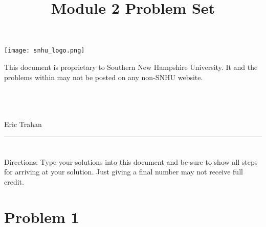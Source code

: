\documentclass{amsart}
\theoremstyle{definition}
\theoremstyle{Exercise}
\theoremstyle{remark}
\theoremstyle{rule}
\numberwithin{equation}{section}
\begin{document}
\title{\sf Module 2 Problem Set}

\begin{center}
\texttt{[image: snhu\_logo.png]}
\end{center}

\maketitle
This document is proprietary to Southern New Hampshire University. It and the problems within may not be posted on any non-SNHU website.\\\\\\\\
\begin{center}
Eric Trahan
\end{center}


\begin{center}
\rule{\textwidth}{0.4pt}
\end{center}


\newpage


\newpage

\section*{}
\section*{}

Directions: Type your solutions into this document and be sure to show all steps for arriving at your solution. Just giving a final number may not receive full credit.\\

\section*{Problem 1}
\end{document}
